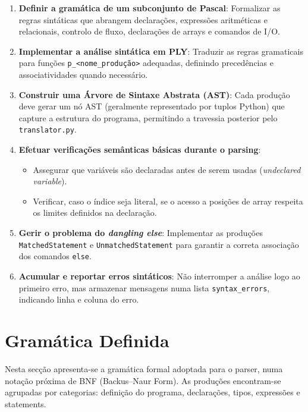\begin{enumerate}
    \item \textbf{Definir a gramática de um subconjunto de Pascal}: Formalizar as regras sintáticas que abrangem declarações, expressões aritméticas e relacionais, controlo de fluxo, declarações de arrays e comandos de I/O.
    
    \item \textbf{Implementar a análise sintática em PLY}: Traduzir as regras gramaticais para funções \texttt{p\_<nome\_produção>} adequadas, definindo precedências e associatividades quando necessário.
    
    \item \textbf{Construir uma Árvore de Sintaxe Abstrata (AST)}: Cada produção deve gerar um nó AST (geralmente representado por tuplos Python) que capture a estrutura do programa, permitindo a travessia posterior pelo \texttt{translator.py}.
    
    \item \textbf{Efetuar verificações semânticas básicas durante o parsing}:
    \begin{itemize}
        \item Assegurar que variáveis são declaradas antes de serem usadas (\emph{undeclared variable}).
        \item Verificar, caso o índice seja literal, se o acesso a posições de array respeita os limites definidos na declaração.
    \end{itemize}
    
    \item \textbf{Gerir o problema do \emph{dangling else}}: Implementar as produções \texttt{MatchedStatement} e \texttt{UnmatchedStatement} para garantir a correta associação dos comandos \texttt{else}.
    
    \item \textbf{Acumular e reportar erros sintáticos}: Não interromper a análise logo ao primeiro erro, mas armazenar mensagens numa lista \texttt{syntax\_errors}, indicando linha e coluna do erro.

\end{enumerate}

\section{Gramática Definida}
\label{sec:gramatica}

Nesta secção apresenta-se a gramática formal adoptada para o parser, numa notação próxima de BNF (Backus–Naur Form). As produções encontram-se agrupadas por categorias: definição do programa, declarações, tipos, expressões e statements. 

